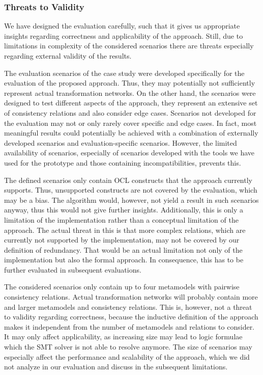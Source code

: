 \subsubsection{Threats to Validity}

We have designed the evaluation carefully, such that it gives us appropriate insights regarding correctness and applicability of the approach.
Still, due to limitations in complexity of the considered scenarios there are threats especially regarding external validity of the results.

The evaluation scenarios of the case study were developed specifically for the evaluation of the proposed approach.
Thus, they may potentially not sufficiently represent actual transformation networks.
On the other hand, the scenarios were designed to test different aspects of the approach, they represent an extensive set of consistency relations and also consider edge cases.
Scenarios not developed for the evaluation may not or only rarely cover specific and edge cases.
In fact, most meaningful results could potentially be achieved with a combination of externally developed scenarios and evaluation-specific scenarios.
However, the limited availability of scenarios, especially of scenarios developed with the tools we have used for the prototype and those containing incompatibilities, prevents this.

The defined scenarios only contain \gls{OCL} constructs that the approach currently supports.
Thus, unsupported constructs are not covered by the evaluation, which may be a bias.
The algorithm would, however, not yield a result in such scenarios anyway, thus this would not give further insights.
Additionally, this is only a limitation of the implementation rather than a conceptual limitation of the approach.
The actual threat in this is that more complex relations, which are currently not supported by the implementation, may not be covered by our definition of redundancy.
That would be an actual limitation not only of the implementation but also the formal approach.
In consequence, this has to be further evaluated in subsequent evaluations.

The considered scenarios only contain up to four metamodels with pairwise consistency relations.
Actual transformation networks will probably contain more and larger metamodels and consistency relations.
This is, however, not a threat to validity regarding correctness, because the inductive definition of the approach makes it independent from the number of metamodels and relations to consider.
It may only affect applicability, as increasing size may lead to logic formulae which the \gls{SMT} solver is not able to resolve anymore.
The size of scenarios may especially affect the performance and scalability of the approach, which we did not analyze in our evaluation and discuss in the subsequent limitations.

